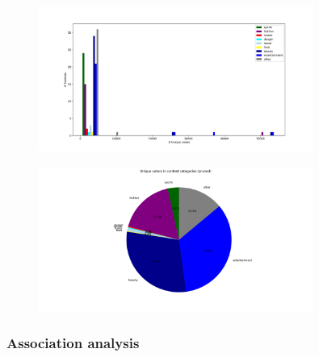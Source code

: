 \begin{figure}[h] 
    \begin{center}
        \includegraphics[width=0.8\textwidth]{Images/user_engagement_in_categories_bar-pruned.png}
        \caption{}
        \label{}
    \end{center}
\end{figure}

\begin{figure}[h] 
    \begin{center}
        \includegraphics[width=0.8\textwidth]{Images/user_engagement_in_categories_pie-pruned.png}
        \caption{}
        \label{}
    \end{center}
\end{figure}


\subsubsection{Association analysis}

